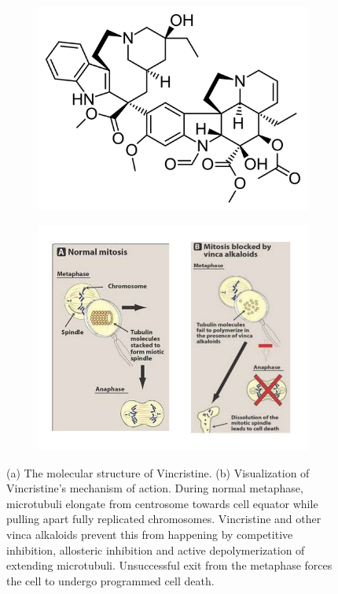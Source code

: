 \documentclass[pdftex,12pt,a4paper]{report}
\begin{document}
\begin{figure}[H]
\centering
\begin{subfigure}{.8\textwidth}
  \centering
  \includegraphics[width=.6\textwidth]{images/vincristine}
  \caption{}
  \label{fig:vincristine}
\end{subfigure}
\centering
\begin{subfigure}{.9\textwidth}
  \centering
  \includegraphics[width=.8\textwidth]{images/vincristine_mechanism}
  \caption{}
  \label{fig:vinchristine_mechanism}
\end{subfigure}
\caption[The structure and mechanism of Vincristine]{(a) The molecular structure of Vincristine. (b) Visualization of Vincristine's mechanism of action. During normal metaphase, microtubuli elongate from centrosome towards cell equator while pulling apart fully replicated chromosomes. Vincristine and other vinca alkaloids prevent this from happening by competitive inhibition, allosteric inhibition and active depolymerization of extending microtubuli. Unsuccessful exit from the metaphase forces the cell to undergo programmed cell death.}
\label{fig:vincs}
\end{figure}
\end{document}
